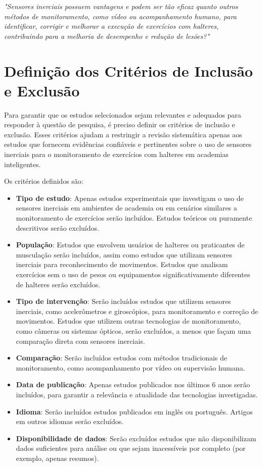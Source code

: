 \documentclass[a4paper,12pt]{article}
\begin{document}
\textit{"Sensores inerciais possuem vantagens e podem ser tão eficaz quanto outros métodos de monitoramento, como vídeo ou acompanhamento humano, para identificar, corrigir e melhorar a execução de exercícios com halteres, contribuindo para a melhoria de desempenho e redução de lesões?"}

\section{Definição dos Critérios de Inclusão e Exclusão}

Para garantir que os estudos selecionados sejam relevantes e adequados para responder à questão de pesquisa, é preciso definir os critérios de inclusão e exclusão. Esses critérios ajudam a restringir a revisão sistemática apenas aos estudos que fornecem evidências confiáveis e pertinentes sobre o uso de sensores inerciais para o monitoramento de exercícios com halteres em academias inteligentes.

Os critérios definidos são:

\begin{itemize}
    \item \textbf{Tipo de estudo}: Apenas estudos experimentais que investigam o uso de sensores inerciais em ambientes de academia ou em cenários similares a monitoramento de exercícios serão incluídos. Estudos teóricos ou puramente descritivos serão excluídos.
    
    \item \textbf{População}: Estudos que envolvem usuários de halteres ou praticantes de musculação serão incluídos, assim como estudos que utilizam sensores inerciais para reconhecimento de movimentos. Estudos que analisam exercícios sem o uso de pesos ou equipamentos significativamente diferentes de halteres serão excluídos.
    
    \item \textbf{Tipo de intervenção}: Serão incluídos estudos que utilizem sensores inerciais, como acelerômetros e giroscópios, para monitoramento e correção de movimentos. Estudos que utilizem outras tecnologias de monitoramento, como câmeras ou sistemas ópticos, serão excluídos, a menos que façam uma comparação direta com sensores inerciais.
    
    \item \textbf{Comparação}: Serão incluídos estudos com métodos tradicionais de monitoramento, como acompanhamento por vídeo ou supervisão humana.
    
    \item \textbf{Data de publicação}: Apenas estudos publicados nos últimos 6 anos serão incluídos, para garantir a relevância e atualidade das tecnologias investigadas.
    
    \item \textbf{Idioma}: Serão incluídos estudos publicados em inglês ou português. Artigos em outros idiomas serão excluídos.
    
    \item \textbf{Disponibilidade de dados}: Serão excluídos estudos que não disponibilizam dados suficientes para análise ou que sejam inacessíveis por completo (por exemplo, apenas resumos).
\end{itemize}
\end{document}
